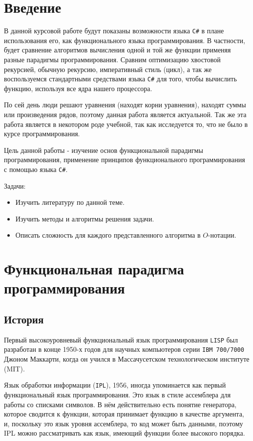 \section*{Введение}

В данной курсовой работе будут показаны возможности языка \texttt{C\#} в плане использования его, как функционального языка программирования.
В частности, будет сравнение алгоритмов вычисления одной и той же функции применяя разные парадигмы программирования.
Сравним оптимизацию хвостовой рекурсией, обычную рекурсию, императивный стиль (цикл), а так же воспользуемся стандартными средствами языка \texttt{C\#} для того, чтобы вычислить функцию, используя все ядра нашего процессора.

По сей день люди решают уравнения (находят корни уравнения), находят суммы или произведения рядов, поэтому данная работа является актуальной. Так же эта работа является в некотором роде учебной, так как исследуется то, что не было в курсе программирования.

Цель данной работы - изучение основ функциональной парадигмы программирования, применение принципов функционального программирования с помощью языка \texttt{C\#}.

Задачи:

\begin{itemize}
	\item Изучить литературу по данной теме.
	\item Изучить методы и алгоритмы решения задачи.
	\item Описать сложность для каждого представленного алгоритма в $O$-нотации.
\end{itemize}

\newpage
\section{Функциональная парадигма программирования}

\subsection{История}

Первый высокоуровневый функциональный язык программирования \texttt{LISP} был разработан в конце 1950-х годов для научных компьютеров серии \texttt{IBM 700/7000} Джоном Маккарти, когда он учился в Массачусетском технологическом институте (MIT). \cite{HistoryofLISP}

Язык обработки информации (\texttt{IPL}), 1956, иногда упоминается как первый функциональный язык программирования.
Это язык в стиле ассемблера для работы со списками символов. \cite{ModelsofMyLife}
В нём действительно есть понятие генератора, которое сводится к функции, которая принимает функцию в качестве аргумента, и, поскольку это язык уровня ассемблера, то код может быть данными, поэтому IPL можно рассматривать как язык, имеющий функции более высокого порядка.

